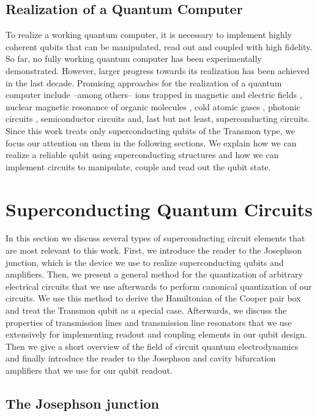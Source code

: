 \subsection{Realization of a Quantum Computer}

To realize a working quantum computer, it is necessary to implement highly coherent qubits that can be manipulated, read out and coupled with high fidelity. So far, no fully working quantum computer has been experimentally demonstrated. However, larger progress towards its realization has been achieved in the last decade. Promising approaches for the realization of a quantum computer include --among others-- ions trapped in magnetic and electric fields \citep{monroe_demonstration_1995,cirac_quantum_1995}, nuclear magnetic resonance of organic molecules \citep{jones_nmr_2001,vandersypen_experimental_2001}, cold atomic gases \citep{briegel_quantum_2000}, photonic circuits \citep{knill_scheme_2001}, semiconductor circuits \citep{loss_quantum_1998} and, last but not least, superconducting circuits. Since this work treats only superconducting qubits of the Transmon type, we focus our attention on them in the following sections. We explain how we can realize a reliable qubit using superconducting structures and how we can implement circuits to manipulate, couple and read out the qubit state.

\section{Superconducting Quantum Circuits}

In this section we discuss several types of superconducting circuit elements that are most relevant to this work. First, we introduce the reader to the Josephson junction, which is the device we use to realize superconducting qubits and amplifiers. Then, we present a general method for the quantization of arbitrary electrical circuits that we use afterwards to perform canonical quantization of our circuits. We use this method to derive the Hamiltonian of the Cooper pair box and treat the Transmon qubit as a special case. Afterwards, we discuss the properties of transmission lines and transmission line resonators that we use extensively for implementing readout and coupling elements in our qubit design. Then we give a short overview of the field of circuit quantum electrodynamics and finally introduce the reader to the Josephson and cavity bifurcation amplifiers that we use for our qubit readout.

\subsection{The Josephson junction}

